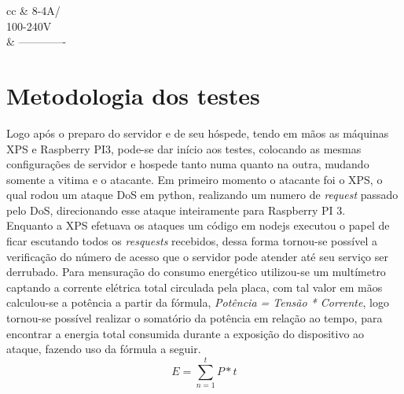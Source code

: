 \documentclass[12pt]{article}
\begin{document}
\begin{table}[!h]
\begin{tabular}{cc}
     & 8-4A/\\100-240V                                                                               \\ \hline
                                                        & -------------                                                                               \\ \hline
    \end{tabular}
    \end{table}

\section{Metodologia dos testes} \label{sec:testes}
  Logo após o preparo do servidor e de seu hóspede, tendo em mãos as máquinas XPS e Raspberry PI3, pode-se dar início aos testes, colocando as mesmas configurações de servidor e hospede tanto numa quanto na outra, mudando somente a vitima e o atacante. Em primeiro momento o atacante foi o XPS, o qual rodou um ataque DoS em python, realizando um numero de \textit{request} passado pelo DoS, direcionando esse ataque inteiramente para Raspberry PI 3.\\
  Enquanto a XPS efetuava os ataques um código em nodejs executou o papel de ficar escutando todos os \textit{resquests} recebidos, dessa forma tornou-se possível a verificação do número de acesso que o servidor pode atender até seu serviço ser derrubado. Para mensuração do consumo energético utilizou-se um multímetro captando a corrente elétrica total circulada pela placa, com tal valor em mãos calculou-se a potência a partir da fórmula, \textit{Potência = Tensão * Corrente}, logo tornou-se possível realizar o somatório da potência em relação ao tempo, para encontrar a energia total consumida durante a exposição do dispositivo ao ataque, fazendo uso da fórmula a seguir. $$E = \sum_{n=1}^{t} P*t$$ \\
\end{document}
